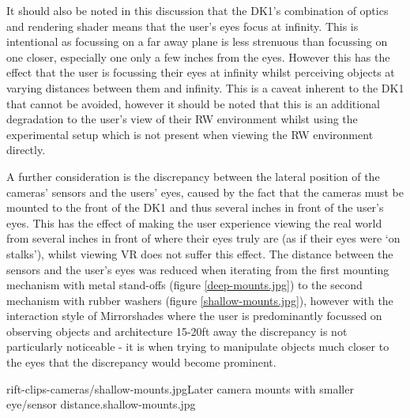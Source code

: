 It should also be noted in this discussion that the DK1's combination of optics and rendering shader means that the user's eyes focus at infinity. This is intentional as focussing on a far away plane is less strenuous than focussing on one closer, especially one only a few inches from the eyes. However this has the effect that the user is focussing their eyes at infinity whilst perceiving objects at varying distances between them and infinity. This is a caveat inherent to the DK1 that cannot be avoided, however it should be noted that this is an additional degradation to the user's view of their RW environment whilst using the experimental setup which is not present when viewing the RW environment directly.

A further consideration is the discrepancy between the lateral position of the cameras' sensors and the users' eyes, caused by the fact that the cameras must be mounted to the front of the DK1 and thus several inches in front of the user's eyes. This has the effect of making the user experience viewing the real world from several inches in front of where their eyes truly are (as if their eyes were `on stalks'), whilst viewing VR does not suffer this effect. The distance between the sensors and the user's eyes was reduced when iterating from the first mounting mechanism with metal stand-offs (figure \ref{deep-mounts.jpg}) to the second mechanism with rubber washers (figure \ref{shallow-mounts.jpg}), however with the interaction style of Mirrorshades where the user is predominantly focussed on observing objects and architecture 15-20ft away the discrepancy is not particularly noticeable - it is when trying to manipulate objects much closer to the eyes that the discrepancy would become prominent.

       {rift-clips-cameras/shallow-mounts.jpg}{Later camera mounts with smaller eye/sensor distance.}{shallow-mounts.jpg}




